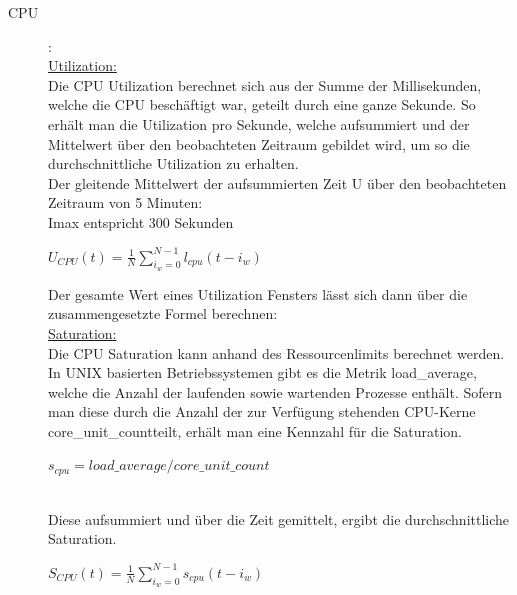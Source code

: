 \documentclass[a4paper,10pt]{scrartcl}
\begin{document}
\begin{description}
\item[CPU]:\\
\underline{Utilization:}\\
Die CPU Utilization berechnet sich aus der Summe der Millisekunden, welche die CPU beschäftigt war, geteilt durch eine ganze Sekunde. So erhält man die Utilization pro Sekunde, welche aufsummiert und der Mittelwert über den beobachteten Zeitraum gebildet wird, um so die durchschnittliche Utilization zu erhalten.\\

Der gleitende Mittelwert der aufsummierten Zeit U über den beobachteten Zeitraum von 5 Minuten:\\
Imax entspricht 300 Sekunden

\begin{minipage}{\linewidth}
\(
\displaystyle{U_{CPU}(t)=\frac{1}{N}{\sum\limits_{i_{w}=0}^{N-1} l_{cpu}{(t-i_{w})}} }
\)


\end{minipage}

Der gesamte Wert eines Utilization Fensters lässt sich dann über die zusammengesetzte Formel berechnen:\\

\underline{Saturation:}\\
Die CPU Saturation kann anhand des Ressourcenlimits berechnet werden. In UNIX basierten Betriebssystemen gibt es die Metrik \glqq load\_average\grqq, welche die Anzahl der laufenden sowie wartenden Prozesse enthält. Sofern man diese durch die Anzahl der zur Verfügung stehenden CPU-Kerne \glqq core\_unit\_count\grqq teilt, erhält man eine Kennzahl für die Saturation.\\

\begin{minipage}{\linewidth}
\(
\displaystyle{s_{cpu}= load\_average / core\_unit\_count}
\)

\end{minipage}\\

Diese aufsummiert und über die Zeit gemittelt, ergibt die durchschnittliche Saturation.\\

\begin{minipage}{\linewidth}
\(
\displaystyle{S_{CPU}(t)=\frac{1}{N}{\sum\limits_{i_{w}=0}^{N-1} s_{cpu}{(t-i_{w})}} }
\)


\end{minipage}
\end{description}
\end{document}
